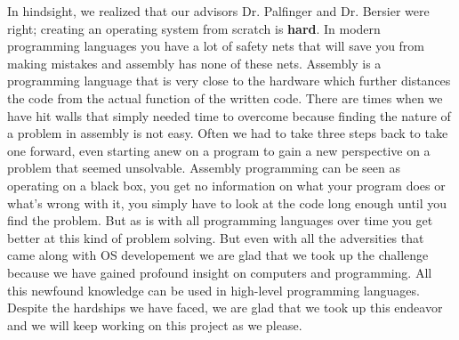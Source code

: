 \documentclass{article}
\begin{document}
In hindsight, we realized that our advisors Dr. Palfinger and Dr. Bersier were right; creating 
an operating system from scratch is \textbf{hard}. In modern programming languages you have a
lot of safety nets that will save you from making mistakes and assembly has none of these nets.
Assembly is a programming language that is very close to the hardware which further distances 
the code from the actual function of the written code. There are times when we have hit
walls that simply needed time to overcome because finding the nature of a problem in assembly
is not easy. Often we had to take three steps back to take one forward, even starting anew on
a program to gain a new perspective on a problem that seemed unsolvable. Assembly programming 
can be seen as operating on a black box, you get no information on what your program does or
what's wrong with it, you simply have to look at the code long enough until you find the problem.
But as is with all programming languages over time you get better at this kind of problem solving.
But even with all the adversities that came along with OS developement we are glad that we took up
the challenge because we have gained profound insight on computers and programming. All this
newfound knowledge can be used in high-level programming languages. Despite the hardships we have 
faced, we are glad that we took up this endeavor and we will keep working on this project as we please.
\end{document}
